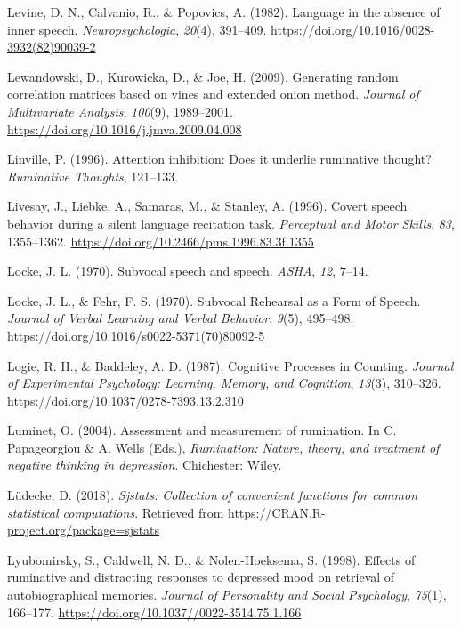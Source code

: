 \documentclass[a4paper,12pt,twoside,openright,oldfontcommands,final]{memoir}
\begin{document}
\leavevmode\hypertarget{ref-levine_language_1982}{}%
Levine, D. N., Calvanio, R., \& Popovics, A. (1982). Language in the absence of inner speech. \emph{Neuropsychologia}, \emph{20}(4), 391--409. \url{https://doi.org/10.1016/0028-3932(82)90039-2}

\leavevmode\hypertarget{ref-lewandowski_generating_2009}{}%
Lewandowski, D., Kurowicka, D., \& Joe, H. (2009). Generating random correlation matrices based on vines and extended onion method. \emph{Journal of Multivariate Analysis}, \emph{100}(9), 1989--2001. \url{https://doi.org/10.1016/j.jmva.2009.04.008}

\leavevmode\hypertarget{ref-linville_attention_1996}{}%
Linville, P. (1996). Attention inhibition: Does it underlie ruminative thought? \emph{Ruminative Thoughts}, 121--133.

\leavevmode\hypertarget{ref-livesay_covert_1996}{}%
Livesay, J., Liebke, A., Samaras, M., \& Stanley, A. (1996). Covert speech behavior during a silent language recitation task. \emph{Perceptual and Motor Skills}, \emph{83}, 1355--1362. \url{https://doi.org/10.2466/pms.1996.83.3f.1355}

\leavevmode\hypertarget{ref-locke_subvocal_1970-1}{}%
Locke, J. L. (1970). Subvocal speech and speech. \emph{ASHA}, \emph{12}, 7--14.

\leavevmode\hypertarget{ref-locke_subvocal_1970}{}%
Locke, J. L., \& Fehr, F. S. (1970). Subvocal Rehearsal as a Form of Speech. \emph{Journal of Verbal Learning and Verbal Behavior}, \emph{9}(5), 495--498. \url{https://doi.org/10.1016/s0022-5371(70)80092-5}

\leavevmode\hypertarget{ref-logie_cognitive_1987}{}%
Logie, R. H., \& Baddeley, A. D. (1987). Cognitive Processes in Counting. \emph{Journal of Experimental Psychology: Learning, Memory, and Cognition}, \emph{13}(3), 310--326. \url{https://doi.org/10.1037/0278-7393.13.2.310}

\leavevmode\hypertarget{ref-luminet_assessment_2004}{}%
Luminet, O. (2004). Assessment and measurement of rumination. In C. Papageorgiou \& A. Wells (Eds.), \emph{Rumination: Nature, theory, and treatment of negative thinking in depression}. Chichester: Wiley.

\leavevmode\hypertarget{ref-R-sjstats}{}%
Lüdecke, D. (2018). \emph{Sjstats: Collection of convenient functions for common statistical computations}. Retrieved from \url{https://CRAN.R-project.org/package=sjstats}

\leavevmode\hypertarget{ref-Lyubomirsky1998}{}%
Lyubomirsky, S., Caldwell, N. D., \& Nolen-Hoeksema, S. (1998). Effects of ruminative and distracting responses to depressed mood on retrieval of autobiographical memories. \emph{Journal of Personality and Social Psychology}, \emph{75}(1), 166--177. \url{https://doi.org/10.1037//0022-3514.75.1.166}
\end{document}
